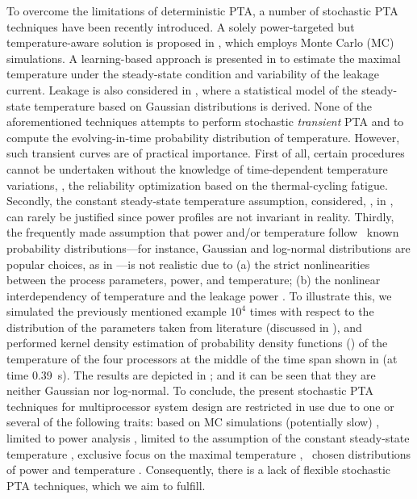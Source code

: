 

To overcome the limitations of deterministic PTA, a number of stochastic PTA techniques have been recently introduced. A solely power-targeted but temperature-aware solution is proposed in \cite{chandra2010}, which employs Monte Carlo (MC) simulations. A learning-based approach is presented in \cite{juan2011} to estimate the maximal temperature under the steady-state condition and variability of the leakage current. Leakage is also considered in \cite{juan2012}, where a statistical model of the steady-state temperature based on Gaussian distributions is derived. None of the aforementioned techniques attempts to perform stochastic \emph{transient} PTA and to compute the evolving-in-time probability distribution of temperature. However, such transient curves are of practical importance. First of all, certain procedures cannot be undertaken without the knowledge of time-dependent temperature variations, \eg, the reliability optimization based on the thermal-cycling fatigue. Secondly, the constant steady-state temperature assumption, considered, \eg, in \cite{juan2011, juan2012}, can rarely be justified since power profiles are not invariant in reality. Thirdly, the frequently made assumption that power and/or temperature follow \apriori\ known probability distributions---for instance, Gaussian and log-normal distributions are popular choices, as in \cite{juan2012, srivastava2010}---is not realistic due to (a) the strict nonlinearities between the process parameters, power, and temperature; (b) the nonlinear interdependency of temperature and the leakage power \cite{liu2007}. To illustrate this, we simulated the previously mentioned example $10^4$ times with respect to the distribution of the parameters taken from literature (discussed in ), and performed kernel density estimation of probability density functions (\pdfs) of the temperature of the four processors at the middle of the time span shown in  (at time 0.39~s). The results are depicted in ; and it can be seen that they are neither Gaussian nor log-normal. To conclude, the present stochastic PTA techniques for multiprocessor system design are restricted in use due to one or several of the following traits: based on MC simulations (potentially slow) \cite{chandra2010}, limited to power analysis \cite{chandra2010}, limited to the assumption of the constant steady-state temperature \cite{juan2011, juan2012}, exclusive focus on the maximal temperature \cite{juan2011}, \apriori\ chosen distributions of power and temperature \cite{juan2012, srivastava2010}. Consequently, there is a lack of flexible stochastic PTA techniques, which we aim to fulfill.


